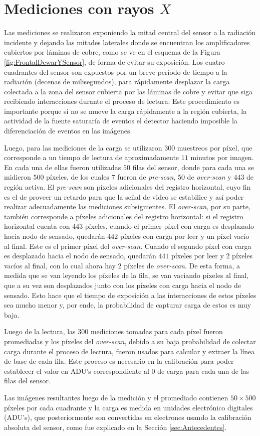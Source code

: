 \section{Mediciones con rayos $X$ \label{sec:Mediciones}}
\noindent Las mediciones se realizaron exponiendo la mitad central del sensor a la radiación incidente y dejando las mitades laterales donde se encuentran los amplificadores cubiertos por láminas de cobre, como se ve en el esquema de la Figura \ref{fig:FrontalDewarYSensor}, de forma de evitar su exposición. Los cuatro cuadrantes del sensor son expuestos por un breve período de tiempo a la radiación (decenas de milisegundos), para rápidamente desplazar la carga colectada a la zona del sensor cubierta por las láminas de cobre y evitar que siga recibiendo interacciones durante el proceso de lectura. Este procedimiento es importante porque si no se mueve la carga rápidamente a la región cubierta, la actividad de la fuente saturaría de eventos el detector haciendo imposible la diferenciación de eventos en las imágenes.
 
Luego, para las mediciones de la carga se utilizaron $300$ muestreos por píxel, que corresponde a un tiempo de lectura de aproximadamente $11$ minutos por imagen. En cada una de ellas fueron utilizadas $50$ filas del sensor, donde para cada una se midieron $500$ píxeles, de los cuales $7$ fueron de \textit{pre-scan}, $50$ de \textit{over-scan} y $443$ de región activa. El \textit{pre-scan} son píxeles adicionales del registro horizontal, cuyo fin es el de proveer un retardo para que la señal de video se estabilice y así poder realizar adecuadamente las mediciones subsiguientes. El \textit{over-scan}, por su parte, también corresponde a píxeles adicionales del registro horizontal: si el registro horizontal cuenta con $443$ píxeles, cuando el primer píxel con carga es desplazado hacia nodo de sensado, quedarán $442$ píxeles con carga por leer y un píxel vacío al final. Este es el primer píxel del \textit{over-scan}. Cuando el segundo píxel con carga es desplazado hacia el nodo de sensado, quedarán $441$ píxeles por leer y 2 píxeles vacíos al final, con lo cual ahora hay 2 píxeles de \textit{over-scan}. De esta forma, a medida que se van leyendo los píxeles de la fila, se van vaciando píxeles al final, que a su vez son desplazados junto con los píxeles con carga hacia el nodo de sensado. Esto hace que el tiempo de exposición a las interacciones de estos píxeles sea mucho menor y, por ende, la probabilidad de capturar carga de estos es muy baja.

Luego de la lectura, las $300$ mediciones tomadas para cada píxel fueron promediadas y los píxeles del \textit{over-scan}, debido a su baja probabilidad de colectar carga durante el proceso de lectura, fueron usados para calcular y extraer la línea de base de cada fila. Este proceso es necesario en la calibración para poder establecer el valor en ADU's correspondiente al $0$ de carga para cada una de las filas del sensor. 

Las imágenes resultantes luego de la medición y el promediado contienen $50 \times 500$ píxeles por cada cuadrante y la carga es medida en unidades electrónico digitales (ADU's), que posteriormente son convertidas en electrones usando la calibración absoluta del sensor, como fue explicado en la Sección \ref{sec:Antecedentes}.